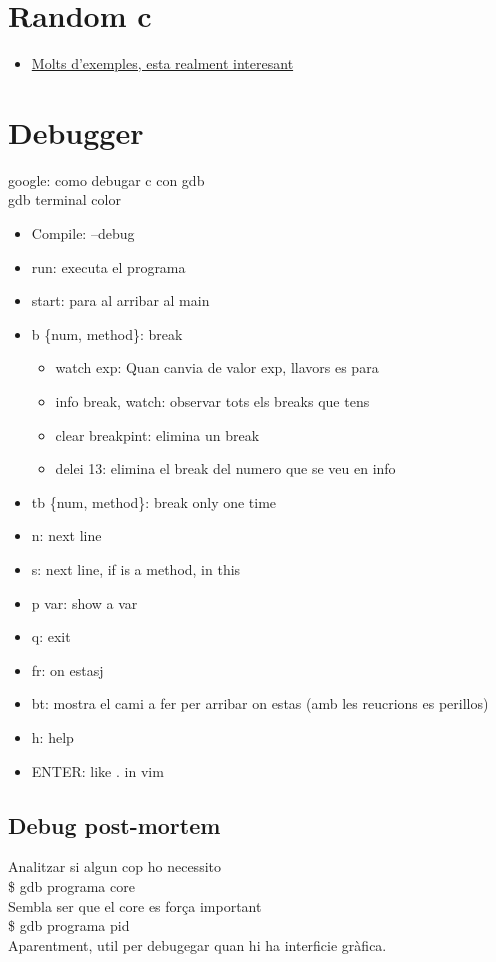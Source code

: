 \documentclass[a4paper,10pt]{article}
\begin{document}
\section{Random c}
\begin{itemize}
\item \href{http://www.programmingsimplified.com/c-program-generate-random-numbers}{Molts d'exemples, esta realment interesant}
\end{itemize}

\section{Debugger}
google: como debugar c con gdb\\
gdb terminal color
\begin{itemize}
\item Compile: --debug
\item run: executa el programa
\item start: para al arribar al main
\item b \{num, method\}: break
	\begin{itemize}
	\item watch exp: Quan canvia de valor exp, llavors es para
	\item info {break, watch}: observar tots els breaks que tens
	\item clear breakpint: elimina un break
	\item delei 13: elimina el break del numero que se veu en info
	\end{itemize}
\item tb \{num, method\}: break only one time
\item n: next line
\item s: next line, if is a method, in this
\item p var: show a var
\item q: exit
\item fr: on estasj
\item bt: mostra el cami a fer per arribar on estas (amb les reucrions es perillos)
\item h: help
\item ENTER: like . in vim
\end{itemize}
\subsection{Debug post-mortem}
Analitzar si algun cop ho necessito\\
\$ gdb programa core\\
Sembla ser que el core es força important\\
\$ gdb programa pid\\
Aparentment, util per debugegar quan hi ha interficie gràfica.
\end{document}

